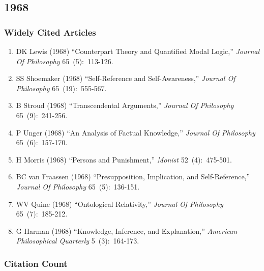 \documentclass[
  10pt,
  letterpaper,
  DIV=11,
  numbers=noendperiod,
  twoside]{scrartcl}
\providecommand{\tightlist}{%
  \setlength{\itemsep}{0pt}\setlength{\parskip}{0pt}}\usepackage{longtable,booktabs,array}
\begin{document}
\newpage

\subsection{1968}\label{sec-s1968}

\subsubsection*{Widely Cited Articles}\label{widely-cited-articles-11}

\begin{enumerate}
\def\labelenumi{\arabic{enumi}.}
\tightlist
\item
  DK Lewis (1968) ``Counterpart Theory and Quantified Modal Logic,''
  \emph{Journal Of Philosophy} 65~(5):~113-126.
\item
  SS Shoemaker (1968) ``Self-Reference and Self-Awareness,''
  \emph{Journal Of Philosophy} 65~(19):~555-567.
\item
  B Stroud (1968) ``Transcendental Arguments,'' \emph{Journal Of
  Philosophy} 65~(9):~241-256.
\item
  P Unger (1968) ``An Analysis of Factual Knowledge,'' \emph{Journal Of
  Philosophy} 65~(6):~157-170.
\item
  H Morris (1968) ``Persons and Punishment,'' \emph{Monist}
  52~(4):~475-501.
\item
  BC van Fraassen (1968) ``Presupposition, Implication, and
  Self-Reference,'' \emph{Journal Of Philosophy} 65~(5):~136-151.
\item
  WV Quine (1968) ``Ontological Relativity,'' \emph{Journal Of
  Philosophy} 65~(7):~185-212.
\item
  G Harman (1968) ``Knowledge, Inference, and Explanation,''
  \emph{American Philosophical Quarterly} 5~(3):~164-173.
\end{enumerate}

\subsubsection*{Citation Count}\label{sec-count-1968}
\end{document}
